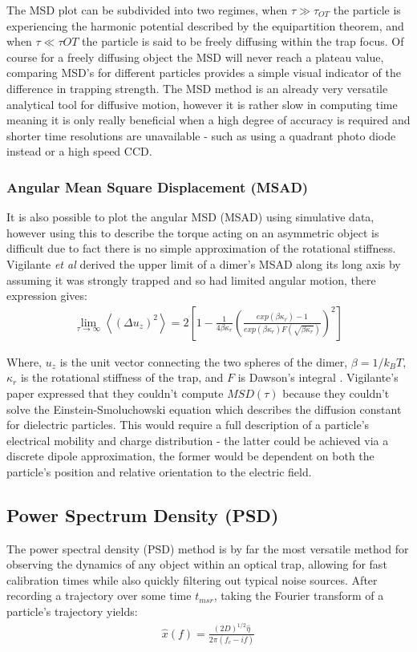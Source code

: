 The MSD plot can be subdivided into two regimes, when $\tau \gg \tau_{OT}$ 
the particle is experiencing the harmonic potential described by 
the equipartition theorem, and when $\tau \ll \tau{OT}$ the particle 
is said to be freely diffusing within the trap focus. Of course for 
a freely diffusing object the MSD will never reach a plateau value, 
comparing MSD's for different particles provides a simple visual 
indicator of the difference in trapping strength. The MSD method is 
an already very versatile analytical tool for diffusive motion, however 
it is rather slow in computing time meaning it is only really beneficial 
when a high degree of accuracy is required and shorter time resolutions 
are unavailable - such as using a quadrant photo diode instead or a high 
speed CCD.

\subsubsection{Angular Mean Square Displacement (MSAD)}
It is also possible to plot the angular MSD (MSAD) using simulative data, 
however using this to describe the torque acting on an asymmetric object 
is difficult due to fact there is no simple approximation of the rotational
stiffness. Vigilante \textit{et al} \cite{Vigilante2020} derived the upper 
limit of a dimer's MSAD along its long axis by assuming it was strongly 
trapped and so had limited angular motion, there expression gives:
\begin{align}
	\lim_{\tau\to\infty}\left<(\Delta u_z)^2\right> = 
	2\left[1-\frac{1}{4\beta\kappa_r} 
	\left(\frac{exp(\beta\kappa_r)-1}
	{exp(\beta\kappa_r)F(\sqrt{\beta\kappa_r})
	}\right)^2\right]
\end{align}  

Where, $u_z$ is the unit vector connecting the two spheres of the dimer, 
$\beta=1/k_BT$, $\kappa_r$ is the rotational stiffness of the trap, and $F$ 
is Dawson's integral \cite{Oldham2008}. Vigilante's paper expressed that 
they couldn't compute $MSD(\tau)$ because they couldn't solve the 
Einstein-Smoluchowski equation which describes the diffusion constant for 
dielectric particles. This would require a full description of a 
particle's electrical mobility and charge distribution - the latter could 
be achieved via a discrete dipole approximation, the former would be 
dependent on both the particle's position and relative orientation to the 
electric field.

\subsection{Power Spectrum Density (PSD)}
The power spectral density (PSD) method is by far the most versatile 
method for observing the dynamics of any object within an optical trap, 
allowing for fast calibration times while also quickly filtering out 
typical noise sources. After recording a trajectory over some time 
$t_{msr}$, taking the Fourier transform of a particle's trajectory 
yields:
\begin{align}
	\hat{x}(f) = \frac{(2D)^{1/2}\hat{\eta}}{2\pi(f_c-if)}
\end{align}


